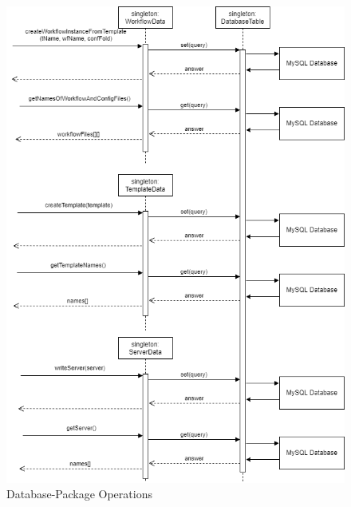 
\begin{figure}[H]
	\includegraphics[width=1\textwidth]{res/Database_Sequence.png} 
	\caption{Database-Package Operations}
\end{figure}